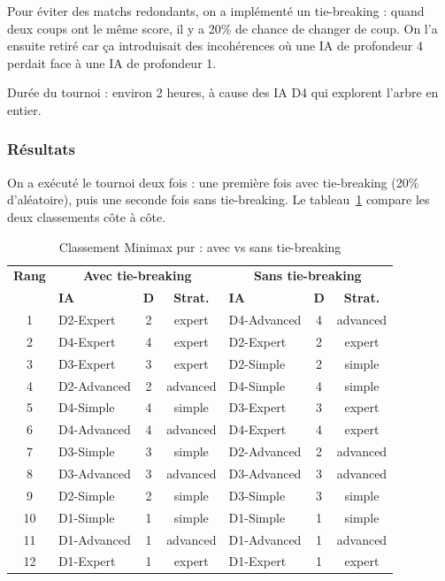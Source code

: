 \documentclass[a4paper, 12pt]{report}
\begin{document}
Pour éviter des matchs redondants, on a implémenté un tie-breaking : quand deux coups ont le même score, il y a 20\% de chance de changer de coup. On l'a ensuite retiré car ça introduisait des incohérences où une IA de profondeur 4 perdait face à une IA de profondeur 1.


Durée du tournoi : environ 2 heures, à cause des IA D4 qui explorent l'arbre en entier.

\subsubsection{Résultats}

On a exécuté le tournoi deux fois : une première fois avec tie-breaking (20\% d'aléatoire), puis une seconde fois sans tie-breaking. Le tableau~\ref{tab:classement-minimax} compare les deux classements côte à côte.

\begin{table}[H]
\centering
\caption{Classement Minimax pur : avec vs sans tie-breaking}
\label{tab:classement-minimax}
\begin{tabular}{c|lcc|lcc}
\toprule
\textbf{Rang} & \multicolumn{3}{c|}{\textbf{Avec tie-breaking}} & \multicolumn{3}{c}{\textbf{Sans tie-breaking}} \\
& \textbf{IA} & \textbf{D} & \textbf{Strat.} & \textbf{IA} & \textbf{D} & \textbf{Strat.} \\
\midrule
1 & D2-Expert & 2 & expert & D4-Advanced & 4 & advanced \\
2 & D4-Expert & 4 & expert & D2-Expert & 2 & expert \\
3 & D3-Expert & 3 & expert & D2-Simple & 2 & simple \\
4 & D2-Advanced & 2 & advanced & D4-Simple & 4 & simple \\
5 & D4-Simple & 4 & simple & D3-Expert & 3 & expert \\
6 & D4-Advanced & 4 & advanced & D4-Expert & 4 & expert \\
7 & D3-Simple & 3 & simple & D2-Advanced & 2 & advanced \\
8 & D3-Advanced & 3 & advanced & D3-Advanced & 3 & advanced \\
9 & D2-Simple & 2 & simple & D3-Simple & 3 & simple \\
10 & D1-Simple & 1 & simple & D1-Simple & 1 & simple \\
11 & D1-Advanced & 1 & advanced & D1-Advanced & 1 & advanced \\
12 & D1-Expert & 1 & expert & D1-Expert & 1 & expert \\
\bottomrule
\end{tabular}
\end{table}
\end{document}

